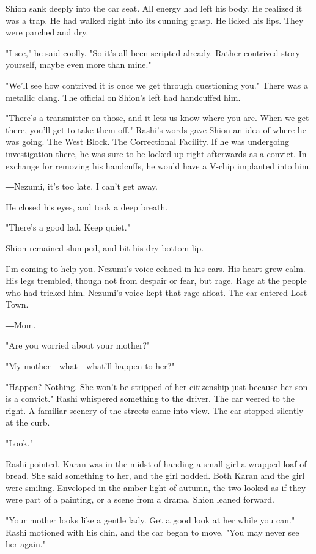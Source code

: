 Shion sank deeply into the car seat. All energy had left his body. He
realized it was a trap. He had walked right into its cunning grasp. He
licked his lips. They were parched and dry.

"I see," he said coolly. "So it's all been scripted already. Rather
contrived story yourself, maybe even more than mine."

"We'll see how contrived it is once we get through questioning you."
There was a metallic clang. The official on Shion's left had handcuffed
him.

"There's a transmitter on those, and it lets us know where you are. When
we get there, you'll get to take them off." Rashi's words gave Shion an
idea of where he was going. The West Block. The Correctional Facility.
If he was undergoing investigation there, he was sure to be locked up
right afterwards as a convict. In exchange for removing his handcuffs,
he would have a V-chip implanted into him.

―Nezumi, it's too late. I can't get away.

He closed his eyes, and took a deep breath.

"There's a good lad. Keep quiet."

Shion remained slumped, and bit his dry bottom lip.

I'm coming to help you. Nezumi's voice echoed in his ears. His heart
grew calm. His legs trembled, though not from despair or fear, but rage.
Rage at the people who had tricked him. Nezumi's voice kept that rage
afloat. The car entered Lost Town.

―Mom.

"Are you worried about your mother?"

"My mother―what―what'll happen to her?"

"Happen? Nothing. She won't be stripped of her citizenship just because
her son is a convict." Rashi whispered something to the driver. The car
veered to the right. A familiar scenery of the streets came into view.
The car stopped silently at the curb.

"Look."

Rashi pointed. Karan was in the midst of handing a small girl a wrapped
loaf of bread. She said something to her, and the girl nodded. Both
Karan and the girl were smiling. Enveloped in the amber light of autumn,
the two looked as if they were part of a painting, or a scene from a
drama. Shion leaned forward.

"Your mother looks like a gentle lady. Get a good look at her while you
can." Rashi motioned with his chin, and the car began to move. "You may
never see her again."

